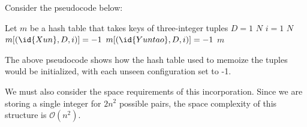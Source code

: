Consider the pseudocode below:

\begin{spacing}{1.2}
    \begin{codebox}
        \li Let $m$ be a hash table that takes keys of three-integer tuples
        \li \For $D = 1$ \To $N$
        \Do
        \li \For $i = 1$ \To $N$
        \Do
        \li $m[(\id{Xun}, D, i)] = -1$
        \li $m[(\id{Yuntao}, D, i)] = -1$
        \End
        \End
        \li \Return $m$
    \end{codebox}
\end{spacing}
\vspace{5mm}

The above pseudocode shows how the hash table used to memoize the tuples would be initialized, with each unseen configuration set to -1.

We must also consider the space requirements of this incorporation. Since we are storing a single integer for $2n^2$ possible pairs, the space complexity of this structure is $\mathcal{O}(n^2)$. \\




